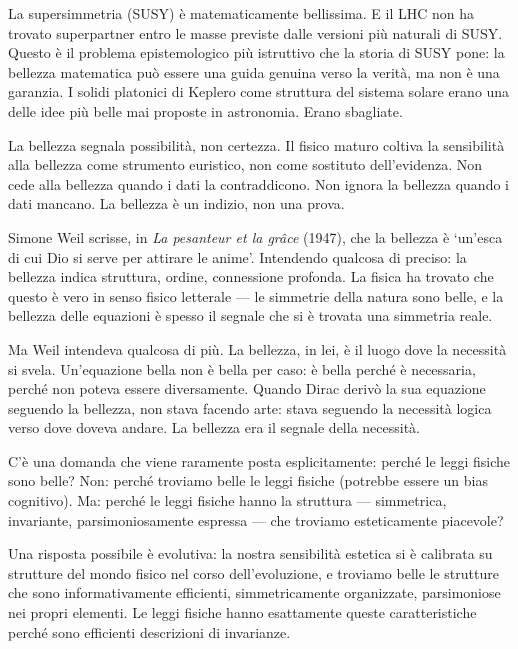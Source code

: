 \documentclass[12pt,a4paper,openany]{book}
\newcommand{\sezione}[1]{\vspace{1.2em}{\large\bfseries #1}\vspace{0.5em}\par}
\begin{document}
\sezione{La supersimmetria: bella e forse sbagliata}

La supersimmetria (SUSY) è matematicamente bellissima. E il LHC non ha trovato superpartner entro le masse previste dalle versioni più naturali di SUSY. Questo è il problema epistemologico più istruttivo che la storia di SUSY pone: la bellezza matematica può essere una guida genuina verso la verità, ma non è una garanzia. I solidi platonici di Keplero come struttura del sistema solare erano una delle idee più belle mai proposte in astronomia. Erano sbagliate.

La bellezza segnala possibilità, non certezza. Il fisico maturo coltiva la sensibilità alla bellezza come strumento euristico, non come sostituto dell'evidenza. Non cede alla bellezza quando i dati la contraddicono. Non ignora la bellezza quando i dati mancano. La bellezza è un indizio, non una prova.

\sezione{Simone Weil e la bellezza come apertura}

Simone Weil scrisse, in \textit{La pesanteur et la grâce} (1947), che la bellezza è `un'esca di cui Dio si serve per attirare le anime'. Intendendo qualcosa di preciso: la bellezza indica struttura, ordine, connessione profonda. La fisica ha trovato che questo è vero in senso fisico letterale — le simmetrie della natura sono belle, e la bellezza delle equazioni è spesso il segnale che si è trovata una simmetria reale.

Ma Weil intendeva qualcosa di più. La bellezza, in lei, è il luogo dove la necessità si svela. Un'equazione bella non è bella per caso: è bella perché è necessaria, perché non poteva essere diversamente. Quando Dirac derivò la sua equazione seguendo la bellezza, non stava facendo arte: stava seguendo la necessità logica verso dove doveva andare. La bellezza era il segnale della necessità.

\sezione{Perché la natura è bella?}

C'è una domanda che viene raramente posta esplicitamente: perché le leggi fisiche sono belle? Non: perché troviamo belle le leggi fisiche (potrebbe essere un bias cognitivo). Ma: perché le leggi fisiche hanno la struttura --- simmetrica, invariante, parsimoniosamente espressa --- che troviamo esteticamente piacevole?

Una risposta possibile è evolutiva: la nostra sensibilità estetica si è calibrata su strutture del mondo fisico nel corso dell'evoluzione, e troviamo belle le strutture che sono informativamente efficienti, simmetricamente organizzate, parsimoniose nei propri elementi. Le leggi fisiche hanno esattamente queste caratteristiche perché sono efficienti descrizioni di invarianze.
\end{document}
